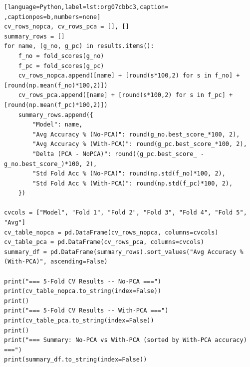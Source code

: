 \documentclass[12pt,a4paper]{article}
\begin{document}
\begin{lstlisting}[language=Python,label=lst:org07cbbc3,caption= ,captionpos=b,numbers=none]
cv_rows_nopca, cv_rows_pca = [], []
summary_rows = []
for name, (g_no, g_pc) in results.items():
    f_no = fold_scores(g_no)
    f_pc = fold_scores(g_pc)
    cv_rows_nopca.append([name] + [round(s*100,2) for s in f_no] + [round(np.mean(f_no)*100,2)])
    cv_rows_pca.append([name] + [round(s*100,2) for s in f_pc] + [round(np.mean(f_pc)*100,2)])
    summary_rows.append({
        "Model": name,
        "Avg Accuracy % (No-PCA)": round(g_no.best_score_*100, 2),
        "Avg Accuracy % (With-PCA)": round(g_pc.best_score_*100, 2),
        "Delta (PCA - NoPCA)": round((g_pc.best_score_ - g_no.best_score_)*100, 2),
        "Std Fold Acc % (No-PCA)": round(np.std(f_no)*100, 2),
        "Std Fold Acc % (With-PCA)": round(np.std(f_pc)*100, 2),
    })

cvcols = ["Model", "Fold 1", "Fold 2", "Fold 3", "Fold 4", "Fold 5", "Avg"]
cv_table_nopca = pd.DataFrame(cv_rows_nopca, columns=cvcols)
cv_table_pca = pd.DataFrame(cv_rows_pca, columns=cvcols)
summary_df = pd.DataFrame(summary_rows).sort_values("Avg Accuracy % (With-PCA)", ascending=False)

print("=== 5-Fold CV Results -- No-PCA ===")
print(cv_table_nopca.to_string(index=False))
print()
print("=== 5-Fold CV Results -- With-PCA ===")
print(cv_table_pca.to_string(index=False))
print()
print("=== Summary: No-PCA vs With-PCA (sorted by With-PCA accuracy) ===")
print(summary_df.to_string(index=False))
\end{lstlisting}
\end{document}
